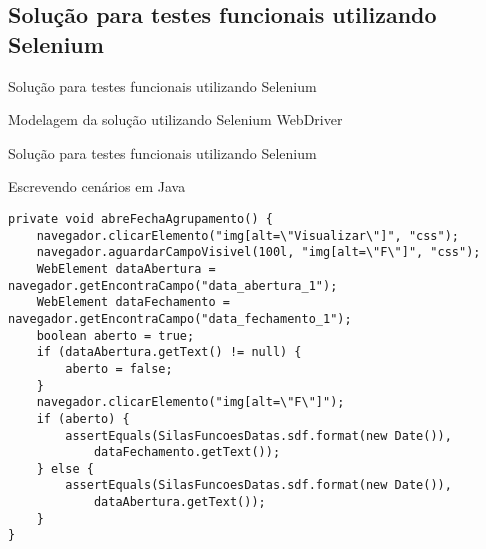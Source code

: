 \documentclass{beamer}
\begin{document}
\subsection{Solução para testes funcionais utilizando Selenium}
\begin{frame}{Solução para testes funcionais utilizando Selenium}
    \item Modelagem da solução utilizando Selenium WebDriver
	\begin{center}\end{center}
\end{frame}
\begin{frame}[fragile]{Solução para testes funcionais utilizando Selenium}
    \item Escrevendo cenários em Java
    \begin{lstlisting}
private void abreFechaAgrupamento() {
	navegador.clicarElemento("img[alt=\"Visualizar\"]", "css");
	navegador.aguardarCampoVisivel(100l, "img[alt=\"F\"]", "css");
	WebElement dataAbertura = navegador.getEncontraCampo("data_abertura_1");
	WebElement dataFechamento = navegador.getEncontraCampo("data_fechamento_1");
	boolean aberto = true;
	if (dataAbertura.getText() != null) {
		aberto = false;
	}
	navegador.clicarElemento("img[alt=\"F\"]");
	if (aberto) {
		assertEquals(SilasFuncoesDatas.sdf.format(new Date()),
		    dataFechamento.getText());
	} else {
		assertEquals(SilasFuncoesDatas.sdf.format(new Date()),
		    dataAbertura.getText());
	}
}
    \end{lstlisting}
\end{frame}
\end{document}
